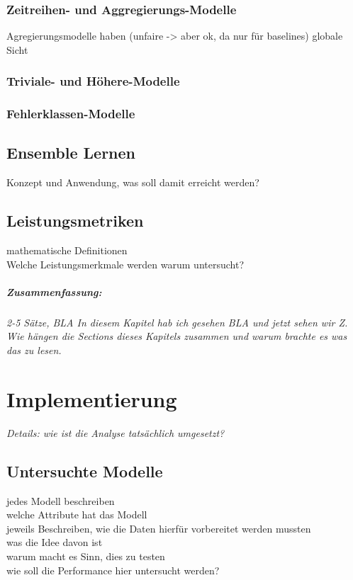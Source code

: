 \documentclass[
	12pt,
	a4paper,
	BCOR10mm,
	DIV14,
	listof=totoc,
	bibliography=totoc,
	headsepline
]{scrreprt}
\begin{document}
\subsection{Zeitreihen- und Aggregierungs-Modelle}
Agregierungsmodelle haben (unfaire -> aber ok, da nur für baselines) globale Sicht\\
\subsection{Triviale- und Höhere-Modelle}
\subsection{Fehlerklassen-Modelle}

\section{Ensemble Lernen}
Konzept und Anwendung, was soll damit erreicht werden?\\

\section{Leistungsmetriken}
mathematische Definitionen\\

Welche Leistungsmerkmale werden warum untersucht?\\

\paragraph{Zusammenfassung:}
\textit{2-5 Sätze, BLA In diesem Kapitel hab ich gesehen BLA und jetzt sehen wir Z. Wie hängen die Sections dieses Kapitels zusammen und warum brachte es was das zu lesen.}\\


\chapter{Implementierung}
\textit{%
	Details: wie ist die Analyse tatsächlich umgesetzt?
}
\bigskip

\section{Untersuchte Modelle}
\label{impl:modelle}
jedes Modell beschreiben\\
welche Attribute hat das Modell\\
jeweils Beschreiben, wie die Daten hierfür vorbereitet werden mussten\\
was die Idee davon ist\\
warum macht es Sinn, dies zu testen\\
wie soll die Performance hier untersucht werden?\\
\end{document}
